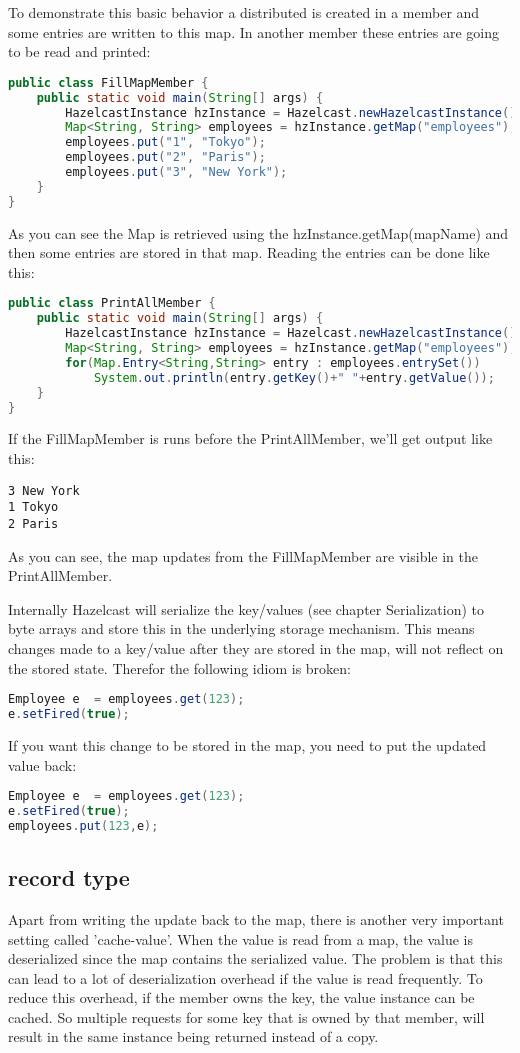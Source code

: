 To demonstrate this basic behavior a distributed is created in a member and some entries are written to this map. In another member these entries are going to be read and printed:
\begin{lstlisting}[language=java]
public class FillMapMember {
    public static void main(String[] args) {
        HazelcastInstance hzInstance = Hazelcast.newHazelcastInstance();
        Map<String, String> employees = hzInstance.getMap("employees");
        employees.put("1", "Tokyo");
        employees.put("2", "Paris");
        employees.put("3", "New York");
    }
}
\end{lstlisting}
As you can see the Map is retrieved using the hzInstance.getMap(mapName) and then some entries are stored in that map. Reading the entries can be done like this:
\begin{lstlisting}[language=java]
public class PrintAllMember {
    public static void main(String[] args) {
        HazelcastInstance hzInstance = Hazelcast.newHazelcastInstance();
        Map<String, String> employees = hzInstance.getMap("employees");
        for(Map.Entry<String,String> entry : employees.entrySet())
            System.out.println(entry.getKey()+" "+entry.getValue());
    }
}
\end{lstlisting}
If the FillMapMember is runs before the PrintAllMember, we'll get output like this:
\begin{lstlisting}
3 New York
1 Tokyo
2 Paris
\end{lstlisting}
As you can see, the map updates from the FillMapMember are visible in the PrintAllMember.

Internally Hazelcast will serialize the key/values (see chapter Serialization) to byte arrays and store this in the underlying storage mechanism. This means changes made to a key/value after they are stored in the map, will not reflect on the stored state. Therefor the following idiom is broken:
\begin{lstlisting}[language=java]
Employee e  = employees.get(123);
e.setFired(true);
\end{lstlisting}
If you want this change to be stored in the map, you need to put the updated value back:
\begin{lstlisting}[language=java]
Employee e  = employees.get(123);
e.setFired(true);
employees.put(123,e);
\end{lstlisting}

\subsection*{record type}
Apart from writing the update back to the map, there is another very important setting called 'cache-value'. When the value is read from a map, the value is deserialized since the map contains the serialized value. The problem is that this can lead to a lot of deserialization overhead if the value is read frequently. To reduce this overhead, if the member owns the key, the value instance can be cached. So multiple requests for some key that is owned by that member, will result in the same instance being returned instead of a copy. 


